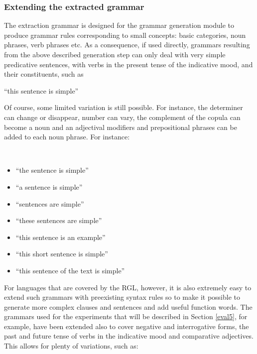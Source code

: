 \subsubsection{Extending the extracted grammar} \label{extend}
The extraction grammar is designed for the grammar generation module to produce grammar rules corresponding to small concepts: basic categories, noun phrases, verb phrases etc. 
As a consequence, if used directly, grammars resulting from the above described generation step can only deal with very simple predicative sentences, with verbs in the present tense of the indicative mood, and their constituents, such as\smallskip

\begin{example}
    ``this sentence is simple''
\end{example}

Of course, some limited variation is still possible. For instance, the determiner can change or disappear, number can vary, the complement of the copula can become a noun and an adjectival modifiers and prepositional phrases can be added to each noun phrase. For instance:

\begin{example} \ 
    \begin{itemize}
        \item ``the sentence is simple''
        \item ``a sentence is simple''
        \item ``sentences are simple''
        \item ``these sentences are simple''
        \item ``this sentence is an example''
        \item ``this short sentence is simple''
        \item ``this sentence of the text is simple''
    \end{itemize}
\end{example}

For languages that are covered by the RGL, however, it is also extremely easy to extend such grammars with preexisting syntax rules so to make it possible to generate more complex clauses and sentences and add useful function words. The grammars used for the experiments that will be described in Section \ref{eval5}, for example, have been extended also to cover negative and interrogative forms, the past and future tense of verbs in the indicative mood and comparative adjectives. This allows for plenty of variations, such as:

